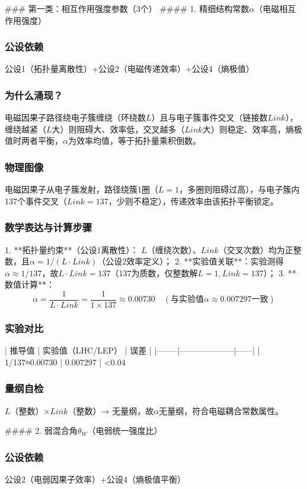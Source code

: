 \documentclass{article}
\begin{document}
### 第一类：相互作用强度参数（3个）
#### 1. 精细结构常数\(\alpha\)（电磁相互作用强度）
\subsubsection{公设依赖}
公设1（拓扑量离散性）+公设2（电磁传递效率）+公设4（熵极值）

\subsubsection{为什么涌现？}
电磁因果子路径绕电子簇缠绕（环绕数\(L\)）且与电子簇事件交叉（链接数\(Link\)），缠绕越紧（\(L\)大）则阻碍大、效率低，交叉越多（\(Link\)大）则稳定、效率高，熵极值时两者平衡，\(\alpha\)为效率均值，等于拓扑量乘积倒数。

\subsubsection{物理图像}
电磁因果子从电子簇发射，路径绕簇1圈（\(L=1\)，多圈则阻碍过高），与电子簇内137个事件交叉（\(Link=137\)，少则不稳定），传递效率由该拓扑平衡锁定。

\subsubsection{数学表达与计算步骤}
1. **拓扑量约束**（公设1离散性）：  
   \(L\)（缠绕次数）、\(Link\)（交叉次数）均为正整数，且\(\alpha = 1/(L·Link)\)（公设2效率定义）；  
2. **实验值关联**：实验测得\(\alpha \approx 1/137\)，故\(L·Link = 137\)（137为质数，仅整数解\(L=1, Link=137\)）；  
3. **数值计算**：  
   \[
   \alpha = \frac{1}{L·Link} = \frac{1}{1×137} ≈ 0.00730 \quad (\text{与实验值}\alpha≈0.007297\text{一致})
   \]

\subsubsection{实验对比}
| 推导值 | 实验值（LHC/LEP） | 误差 |
|--------|--------------------|------|
| 1/137≈0.00730 | 0.007297 | <0.04%

\subsubsection{量纲自检}
\(L\)（整数）×\(Link\)（整数）→ 无量纲，故\(\alpha\)无量纲，符合电磁耦合常数属性。


#### 2. 弱混合角\(\theta_W\)（电弱统一强度比）
\subsubsection{公设依赖}
公设2（电弱因果子效率）+公设4（熵极值平衡）
\end{document}
